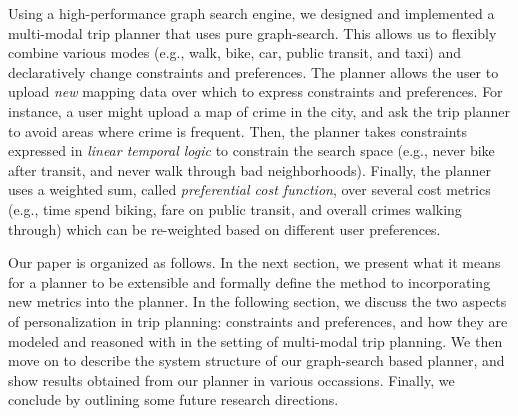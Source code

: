 \documentclass[letterpaper]{article}
\newcommand{\tit}[1]{\textit{#1}}
\begin{document}
Using a high-performance graph search
engine\cite{zhou2011dynamic}, we designed and implemented a 
multi-modal trip planner that uses pure
graph-search. This allows us to flexibly combine various modes
(e.g., walk, bike, car, public transit, and taxi) and 
declaratively change constraints and preferences. 
The planner allows the user
to upload \tit{new} mapping data over which to express
constraints and preferences.  For instance, a user might upload a map of crime
in the city, and ask the trip planner to avoid areas where crime is frequent.
Then, the planner takes constraints expressed in \tit{linear
temporal logic} to constrain the search space (e.g., never bike after
transit, and never walk through bad neighborhoods).
Finally, the planner uses a weighted sum, called \tit{preferential cost function}, 
over several cost metrics (e.g., time spend biking, fare on public transit, 
and overall crimes walking through) which can be re-weighted based
on different user preferences. 

Our paper is organized as follows.
In the next section, we present what it means for a planner to be extensible
and formally define the method to incorporating new metrics into the planner.
In the following section, we discuss the two aspects of personalization
in trip planning: constraints and preferences, and how they are modeled and
reasoned with in the setting of multi-modal trip planning.
We then move on to describe the system structure of our graph-search based planner,
and show results obtained from our planner in various occassions.
Finally, we conclude by outlining some future research directions.
\end{document}
